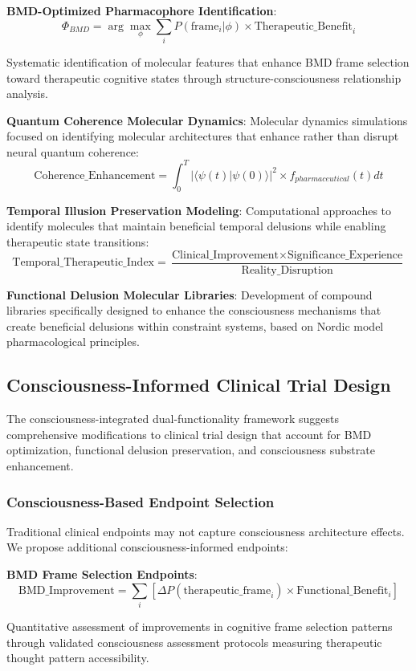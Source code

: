 \documentclass[12pt,a4paper]{article}
\begin{document}
\textbf{BMD-Optimized Pharmacophore Identification}:
$$\Phi_{BMD} = \arg\max_{\phi} \sum_{i} P(\text{frame}_i | \phi) \times \text{Therapeutic\_Benefit}_i$$

Systematic identification of molecular features that enhance BMD frame selection toward therapeutic cognitive states through structure-consciousness relationship analysis.

\textbf{Quantum Coherence Molecular Dynamics}:
Molecular dynamics simulations focused on identifying molecular architectures that enhance rather than disrupt neural quantum coherence:
$$\text{Coherence\_Enhancement} = \int_0^T |\langle\psi(t)|\psi(0)\rangle|^2 \times f_{pharmaceutical}(t) dt$$

\textbf{Temporal Illusion Preservation Modeling}:
Computational approaches to identify molecules that maintain beneficial temporal delusions while enabling therapeutic state transitions:
$$\text{Temporal\_Therapeutic\_Index} = \frac{\text{Clinical\_Improvement} \times \text{Significance\_Experience}}{\text{Reality\_Disruption}}$$

\textbf{Functional Delusion Molecular Libraries}:
Development of compound libraries specifically designed to enhance the consciousness mechanisms that create beneficial delusions within constraint systems, based on Nordic model pharmacological principles.

\subsection{Consciousness-Informed Clinical Trial Design}

The consciousness-integrated dual-functionality framework suggests comprehensive modifications to clinical trial design that account for BMD optimization, functional delusion preservation, and consciousness substrate enhancement.

\subsubsection{Consciousness-Based Endpoint Selection}

Traditional clinical endpoints may not capture consciousness architecture effects. We propose additional consciousness-informed endpoints:

\textbf{BMD Frame Selection Endpoints}:
$$\text{BMD\_Improvement} = \sum_{i} [\Delta P(\text{therapeutic\_frame}_i) \times \text{Functional\_Benefit}_i]$$

Quantitative assessment of improvements in cognitive frame selection patterns through validated consciousness assessment protocols measuring therapeutic thought pattern accessibility.
\end{document}
